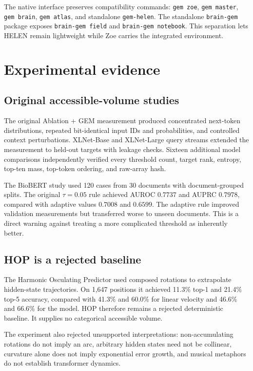 \documentclass[11pt,a4paper]{article}
\begin{document}
The native interface preserves compatibility commands: \texttt{gem zoe}, \texttt{gem master}, \texttt{gem brain}, \texttt{gem atlas}, and standalone \texttt{gem-helen}. The standalone \texttt{brain-gem} package exposes \texttt{brain-gem field} and \texttt{brain-gem notebook}. This separation lets HELEN remain lightweight while Zoe carries the integrated environment.

\section{Experimental evidence}
\subsection{Original accessible-volume studies}
The original Ablation + GEM measurement produced concentrated next-token distributions, repeated bit-identical input IDs and probabilities, and controlled context perturbations. XLNet-Base and XLNet-Large query streams extended the measurement to held-out targets with leakage checks. Sixteen additional model comparisons independently verified every threshold count, target rank, entropy, top-ten mass, top-token ordering, and raw-array hash.

The BioBERT study used 120 cases from 30 documents with document-grouped splits. The original $\tau=0.05$ rule achieved AUROC $0.7737$ and AUPRC $0.7978$, compared with adaptive values $0.7008$ and $0.6599$. The adaptive rule improved validation measurements but transferred worse to unseen documents. This is a direct warning against treating a more complicated threshold as inherently better.

\subsection{HOP is a rejected baseline}
The Harmonic Osculating Predictor used composed rotations to extrapolate hidden-state trajectories. On 1,647 positions it achieved 11.3\% top-1 and 21.4\% top-5 accuracy, compared with 41.3\% and 60.0\% for linear velocity and 46.6\% and 66.6\% for the model. HOP therefore remains a rejected deterministic baseline. It supplies no categorical accessible volume.

The experiment also rejected unsupported interpretations: non-accumulating rotations do not imply an arc, arbitrary hidden states need not be collinear, curvature alone does not imply exponential error growth, and musical metaphors do not establish transformer dynamics.
\end{document}
